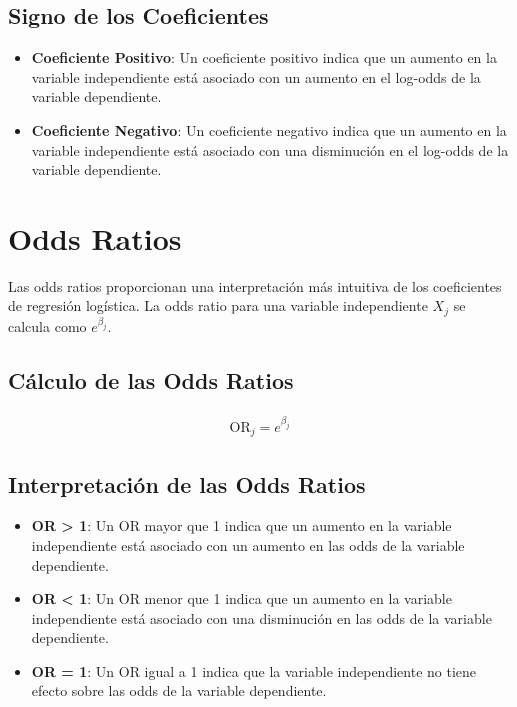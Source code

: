 \documentclass[a4paper]{report} %
\begin{document}
\subsection{Signo de los Coeficientes}

\begin{itemize}
    \item \textbf{Coeficiente Positivo}: Un coeficiente positivo indica que un aumento en la variable independiente est\'a asociado con un aumento en el log-odds de la variable dependiente.
    \item \textbf{Coeficiente Negativo}: Un coeficiente negativo indica que un aumento en la variable independiente est\'a asociado con una disminuci\'on en el log-odds de la variable dependiente.
\end{itemize}

\section{Odds Ratios}

Las odds ratios proporcionan una interpretaci\'on m\'as intuitiva de los coeficientes de regresi\'on log\'istica. La odds ratio para una variable independiente $X_j$ se calcula como $e^{\beta_j}$.

\subsection{C\'alculo de las Odds Ratios}

\begin{eqnarray*}
\text{OR}_j = e^{\beta_j}
\end{eqnarray*}

\subsection{Interpretaci\'on de las Odds Ratios}

\begin{itemize}
    \item \textbf{OR > 1}: Un OR mayor que 1 indica que un aumento en la variable independiente est\'a asociado con un aumento en las odds de la variable dependiente.
    \item \textbf{OR < 1}: Un OR menor que 1 indica que un aumento en la variable independiente est\'a asociado con una disminuci\'on en las odds de la variable dependiente.
    \item \textbf{OR = 1}: Un OR igual a 1 indica que la variable independiente no tiene efecto sobre las odds de la variable dependiente.
\end{itemize}
\end{document}
